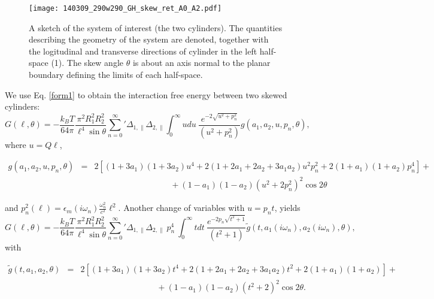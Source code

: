 \documentclass[onecolumn,letterpaper,amsmath,amssymb,floatfix,aps,superscriptaddress]{revtex4}
\begin{document}
\begin{figure}
\centerline{\texttt{[image: 140309\_290w290\_GH\_skew\_ret\_A0\_A2.pdf]}}
\caption{A sketch of the system of interest (the two cylinders). The quantities describing the geometry of the system are 
denoted, together with the logitudinal and transverse directions of cylinder in the left half-space (1). The skew angle $\theta$ is about an axis normal to the planar boundary defining the limits of each half-space.
}
\label{fig:sketch}
\end{figure}

We use  Eq. \ref{form1} to obtain the interaction free energy between two skewed cylinders:
\begin{equation}
G(\ell,\theta) = - \frac{k_BT}{64 \pi} \frac{ \pi^2 R_1^{2} R_2^{2} }{\ell^{4} \sin{\theta}} {\sum_{n=0}^{\infty}}' \Delta_{1,\parallel} \Delta_{2,\parallel} \int_0^{\infty}  u du ~\frac{e^{- 2 \sqrt{u^{2} + p_n^{2}}}}{(u^{2} + p_n^{2})}  g(a_1, a_2, u, p_n, \theta),
\label{pars-3}
\end{equation}
where $u = Q \ell$,  
\begin{widetext}
\begin{eqnarray}
g(a_1, a_2, u, p_n, \theta) &=&  2 \left[ (1+3a_1)(1+3a_2) u^{4} + 2(1+2a_1+2a_2+3a_1a_2) u^{2}p_n^{2}  + 2(1+a_1)(1+a_2) p_n^{4}\right] + \nonumber \\ 
& & ~~~~~~~~~~~~~~~~~~~~~~~~~~~~~~~~~~~~~~~~~ + (1-a_1)(1-a_2)(u^{2} + 2 p_n^{2})^2 \cos 2\theta
\end{eqnarray}
\end{widetext}
and $p_n^{2}(\ell) =  \epsilon_m(i \omega_n) \frac{\omega_n^{2}}{c^{2}} \ell^{2}$. Another change of variables with $u = p_n t$, yields 
\begin{equation}
G(\ell,\theta) = - \frac{k_BT}{64 \pi} \frac{ \pi^2 R_1^{2} R_2^{2} }{\ell^{4} \sin{\theta}} {\sum_{n=0}^{\infty}}' \Delta_{1,\parallel} \Delta_{2,\parallel} ~p_n^{4} ~\int_0^{\infty} t dt ~\frac{e^{- 2 p_n \sqrt{t^{2} + 1}}}{(t^{2} + 1)} \tilde g(t, a_1(i \omega_n), a_2(i \omega_n), \theta),
\label{pars-31}
\end{equation}
with
\begin{widetext}
\begin{eqnarray}
\tilde g(t, a_1, a_2, \theta) &=& 2 \left[ (1+3a_1)(1+3a_2) t^{4} + 2 (1+2a_1+2a_2+3a_1a_2) t^{2}  + 2(1+a_1)(1+a_2)\right] + \nonumber \\
& & ~~~~~~~~~~~~~~~~~~~~~~~~~~~~~~~~~~~~~~~~~ + (1-a_1)(1-a_2)(t^{2} + 2)^2 \cos 2\theta.
\label{pars-31-g}
\end{eqnarray}
\end{widetext}
\end{document}
